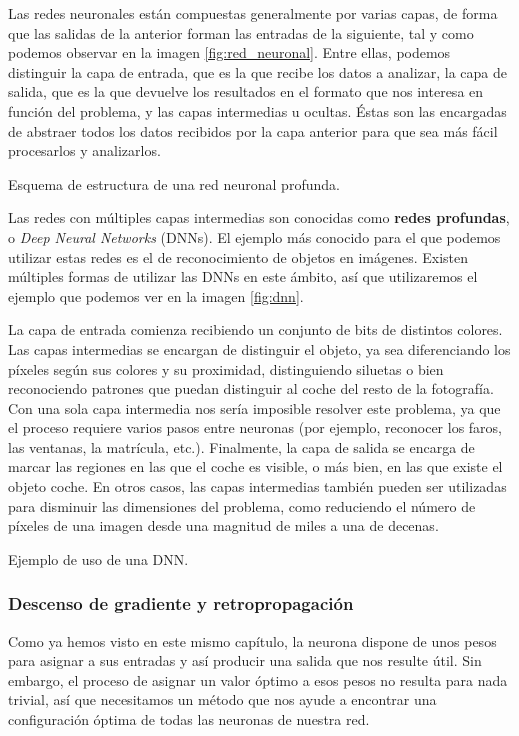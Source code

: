 Las redes neuronales están compuestas generalmente por varias capas, de forma que las salidas de la anterior forman las entradas de la siguiente, tal y como podemos observar en la imagen \ref{fig:red_neuronal}. Entre ellas, podemos distinguir la capa de entrada, que es la que recibe los datos a analizar, la capa de salida, que es la que devuelve los resultados en el formato que nos interesa en función del problema, y las capas intermedias u ocultas. Éstas son las encargadas de abstraer todos los datos recibidos por la capa anterior para que sea más fácil procesarlos y analizarlos. 

%
       {Esquema de estructura de una red neuronal profunda.}

Las redes con múltiples capas intermedias son conocidas como \textbf{redes profundas}, o \textit{Deep Neural Networks} (DNNs). El ejemplo más conocido para el que podemos utilizar estas redes es el de reconocimiento de objetos en imágenes. Existen múltiples formas de utilizar las DNNs en este ámbito, así que utilizaremos el ejemplo que podemos ver en la imagen \ref{fig:dnn}. 

La capa de entrada comienza recibiendo un conjunto de bits de distintos colores. Las capas intermedias se encargan de distinguir el objeto, ya sea diferenciando los píxeles según sus colores y su proximidad, distinguiendo siluetas o bien reconociendo patrones que puedan distinguir al coche del resto de la fotografía. Con una sola capa intermedia nos sería imposible resolver este problema, ya que el proceso requiere varios pasos entre neuronas (por ejemplo, reconocer los faros, las ventanas, la matrícula, etc.). Finalmente, la capa de salida se encarga de marcar las regiones en las que el coche es visible, o más bien, en las que existe el objeto coche. En otros casos, las capas intermedias también pueden ser utilizadas para disminuir las dimensiones del problema, como reduciendo el número de píxeles de una imagen desde una magnitud de miles a una de decenas.

%
       {Ejemplo de uso de una DNN.}    

\subsubsection{Descenso de gradiente y retropropagación}

Como ya hemos visto en este mismo capítulo, la neurona dispone de unos pesos para asignar a sus entradas y así producir una salida que nos resulte útil. Sin embargo, el proceso de asignar un valor óptimo a esos pesos no resulta para nada trivial, así que necesitamos un método que nos ayude a encontrar una configuración óptima de todas las neuronas de nuestra red.
 
